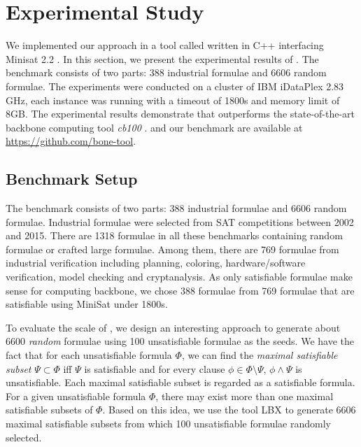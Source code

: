\section{Experimental Study}\label{sec:expr}
We implemented our approach in a tool called \tool written in C++ interfacing Minisat 2.2 \cite{MINISAT}. 
In this section, we present the experimental results of \tool.
The benchmark consists of two parts: 388 industrial formulae and 6606 random formulae.
The experiments were conducted on a cluster of IBM iDataPlex 2.83 GHz, each instance was running with a timeout of 1800s and memory limit of 8GB.
The experimental results demonstrate that \tool outperforms the  state-of-the-art backbone computing tool
\textit{cb100} \cite{JLM15}. \tool and our benchmark are available at \url{https://github.com/bone-tool}.

\subsection{Benchmark Setup}
The benchmark consists of two parts: 388 industrial formulae and 6606 random formulae.
Industrial formulae were selected from SAT competitions between 2002 and 2015.
There are 1318 formulae in all these benchmarks containing random formulae or crafted large formulae.
Among them, there are 769 formulae from industrial verification including planning, coloring, hardware/software verification, model checking and cryptanalysis.
As only satisfiable formulae make sense for computing backbone, we chose 388 formulae from 769 formulae that are satisfiable using MiniSat under 1800s.


To evaluate the scale  of \tool, we design an interesting approach to generate about 6600 \textit{random} formulae using 100 unsatisfiable formulae as the seeds. We have the fact that for each unsatisfiable formula $\Phi$, we can find the \textit{maximal satisfiable subset} $\Psi\subset \Phi$
iff $\Psi$ is satisfiable and for every clause $\phi\in\Phi\setminus \Psi$, $\phi\wedge \Psi$ is unsatisfiable.
Each maximal satisfiable subset is regarded as a satisfiable formula.
For a given unsatisfiable formula $\Phi$, there may exist more than one maximal satisfiable subsets of $\Phi$. Based on this idea, we use the tool LBX \cite{MPA2015} to generate 6606 maximal satisfiable subsets from which 100 unsatisfiable formulae randomly selected.







